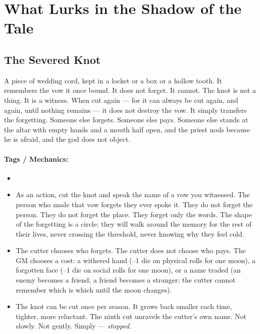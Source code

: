 \section*{What Lurks in the Shadow of the Tale}

\subsection*{The Severed Knot}

A piece of wedding cord, kept in a locket or a box or a hollow tooth. It remembers the vow it once bound. It does not forget. It cannot. The knot is not a thing. It is a witness. When cut again --- for it can always be cut again, and again, until nothing remains --- it does not destroy the vow. It simply transfers the forgetting. Someone else forgets. Someone else pays. Someone else stands at the altar with empty hands and a mouth half open, and the priest nods because he is afraid, and the god does not object.

\paragraph{Tags / Mechanics:}
\begin{itemize}
\item [CURSE] [TRUTH] [OATH] [SILENCE]
\item As an action, cut the knot and speak the name of a vow you witnessed. The person who made that vow forgets they ever spoke it. They do not forget the person. They do not forget the place. They forget only the words. The shape of the forgetting is a circle: they will walk around the memory for the rest of their lives, never crossing the threshold, never knowing why they feel cold.
\item The cutter chooses who forgets. The cutter does not choose who pays. The GM chooses a cost: a withered hand (--1 die on physical rolls for one moon), a forgotten face (--1 die on social rolls for one moon), or a name traded (an enemy becomes a friend; a friend becomes a stranger; the cutter cannot remember which is which until the moon changes).
\item The knot can be cut once per season. It grows back smaller each time, tighter, more reluctant. The ninth cut unravels the cutter's own name. Not slowly. Not gently. Simply --- \textit{stopped}.
\end{itemize}

